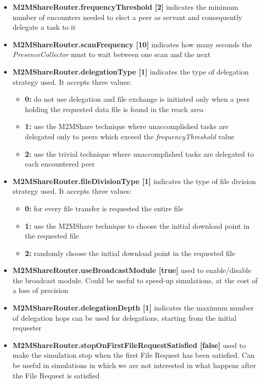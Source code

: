\begin{itemize}
\item \textbf{M2MShareRouter.frequencyThreshold [2]} indicates the minimum number of encounters needed to elect a peer as servant and consequently delegate a task to it 
\item \textbf{M2MShareRouter.scanFrequency [10]} indicates how many seconds the \textit{PresenceCollector} must to wait between one scan and the next
\item \textbf{M2MShareRouter.delegationType [1]} indicates the type of delegation strategy used. It accepts three values:
\begin{itemize}
\item \textbf{0:} do not use delegation and file exchange is initiated only when a peer holding the requested data file is found in the reach area 
\item \textbf{1:} use the M2MShare technique where unaccomplished tasks are delegated only to peers which exceed the \textit{frequencyThreshold} value
\item \textbf{2:} use the trivial technique where unaccomplished tasks are delegated to each encountered peer
\end{itemize}
\item \textbf{M2MShareRouter.fileDivisionType [1]} indicates the type of file division strategy used. It accepts three values:
\begin{itemize}
\item \textbf{0:} for every file transfer is requested the entire file
\item \textbf{1:} use the M2MShare technique to choose the initial download point in the requested file
\item \textbf{2:} randomly choose the initial download point in the requested file
\end{itemize}
\item \textbf{M2MShareRouter.useBroadcastModule [true]} used to enable/disable the broadcast module. Could be useful to speed-up simulations, at the cost of a loss of precision
\item \textbf{M2MShareRouter.delegationDepth [1]} indicates the maximum number of delegation hops can be used for delegations, starting from the initial requester
\item \textbf{M2MShareRouter.stopOnFirstFileRequestSatisfied [false]} used to make the simulation stop when the first File Request has been satisfied. Can be useful in simulations in which we are not interested in what happens after the File Request is satisfied
\end{itemize}

